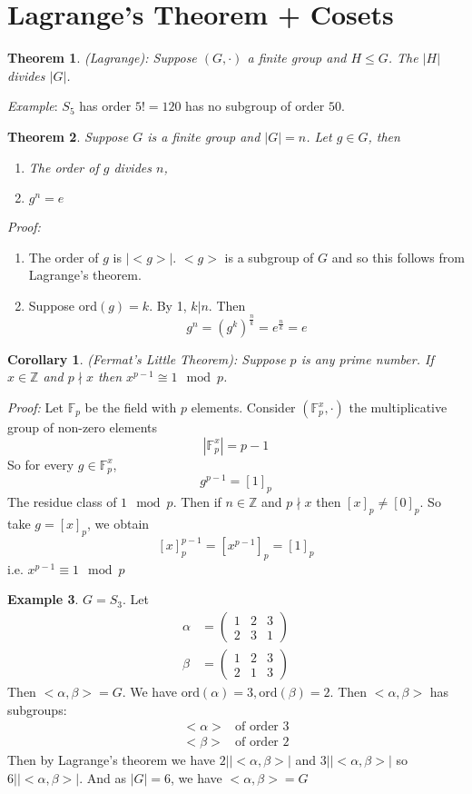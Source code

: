 \documentclass{report}
\newtheorem{theorem}{Theorem}[subsection]
\newtheorem*{corollary}{Corollary}
\theoremstyle{remark}
\theoremstyle{definition}
\theoremstyle{definition}
\newtheorem{example}[theorem]{Example}
\theoremstyle{theorem}
\begin{document}
\section{Lagrange's Theorem + Cosets}
\begin{theorem}
\emph{(Lagrange)}: Suppose $(G,\cdot)$ a finite group and $H \leq G$. The $|H|$ divides $|G|$.
\end{theorem}
\emph{Example}: $S_5$ has order $5!=120$ has no subgroup of order $50$.
\begin{theorem}
Suppose $G$ is a finite group and $|G|=n$. Let $g \in G$, then
\begin{enumerate}[label=\textcircled{\tiny{\arabic*}}]
    \item The order of $g$ divides $n$,
    \item $g^n=e$
\end{enumerate}
\end{theorem}
\emph{Proof:} \begin{enumerate}[label=\textcircled{\tiny{\arabic*}}]
    \item The order of $g$ is $|<g>|$. $<g>$ is a subgroup of $G$ and so this follows from Lagrange's theorem.
    \item Suppose $\mathrm{ord}(g)=k$. By \textcircled{\tiny{1}}, $k|n$. Then
    \[g^n=(g^k)^{\frac{n}{k}}=e^{\frac{n}{k}}=e\]
\end{enumerate}
\begin{corollary}
(Fermat's Little Theorem): Suppose $p$ is any prime number. If $x \in \mathbb{Z}$ and $p \nmid x$ then $x^{p-1} \cong 1 \mod p$.
\end{corollary}
\emph{Proof:} Let $\mathbb{F}_p$ be the field with $p$ elements. Consider $(\mathbb{F}_p^x,\cdot)$ the multiplicative group of non-zero elements
\[|\mathbb{F}_p^x|=p-1\]
So for every $g \in \mathbb{F}_p^x$,
\[g^{p-1}=[1]_p\]
The residue class of $1 \mod p$. Then if $n \in \mathbb{Z}$ and $p \nmid x$ then $[x]_p \neq [0]_p$. So take $g=[x]_p$, we obtain
\[[x]_p^{p-1}=[x^{p-1}]_p=[1]_p\]
i.e. $x^{p-1} \equiv 1 \mod p$
\begin{example}
$G=S_3$. Let
\begin{align*}
    \alpha &= \begin{pmatrix}
    1&2&3\\
    2&3&1
    \end{pmatrix}\\
    \beta &= \begin{pmatrix}
    1&2&3\\
    2&1&3
    \end{pmatrix}
\end{align*}
Then $<\alpha,\beta>=G$. We have $\mathrm{ord}(\alpha)=3, \mathrm{ord}(\beta)=2$. Then $<\alpha, \beta>$ has subgroups:
\[\begin{array}{cc}
    <\alpha> & \text{of order 3}  \\
    <\beta> & \text{of order 2}
\end{array}\]
Then by Lagrange's theorem we have $2| |<\alpha,\beta>|$ and $3| |<\alpha,\beta>|$ so $6||<\alpha,\beta>|$. And as $|G|=6$, we have $<\alpha,\beta>=G$
\end{example}
\end{document}
